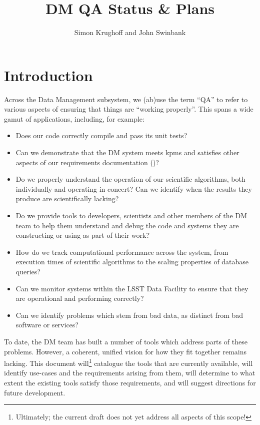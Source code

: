 \documentclass[DM,authoryear,toc,lsstdraft]{lsstdoc}
\title{DM QA Status \& Plans}
\author{%
Simon Krughoff and
John Swinbank
}
\date{\vcsDate}
\begin{document}
\maketitle

\section{Introduction}
\label{sec:intro}

Across the Data Management subsystem, we (ab)use the term ``QA'' to refer to
various aspects of ensuring that things are ``working properly''. This spans a
wide gamut of applications, including, for example:

\begin{itemize}

\item{Does our code correctly compile and pass its unit tests?}
\item{Can we demonstrate that the DM system meets \glspl{kpm} and satisfies
other aspects of our requirements documentation ()?}
\item{Do we properly understand the operation of our scientific algorithms,
both individually and operating in concert? Can we identify when the results
they produce are scientifically lacking?}
\item{Do we provide tools to developers, scientists and other members of the
DM team to help them understand and debug the code and systems they are
constructing or using as part of their work?}
\item{How do we track computational performance across the system, from
execution times of scientific algorithms to the scaling properties of database
queries?}
\item{Can we monitor systems within the LSST Data Facility to ensure that they
are operational and performing correctly?}
\item{Can we identify problems which stem from bad data, as distinct from bad
software or services?}

\end{itemize}

To date, the DM team has built a number of tools which address parts of these
problems. However, a coherent, unified vision for how they fit together
remains lacking. This document will\footnote{Ultimately; the current draft
does not yet address all aspects of this scope!} catalogue the tools that are currently
available, will identify use-cases and the requirements arising from them,
will determine to what extent the existing tools satisfy those requirements,
and will suggest directions for future development.
\end{document}
